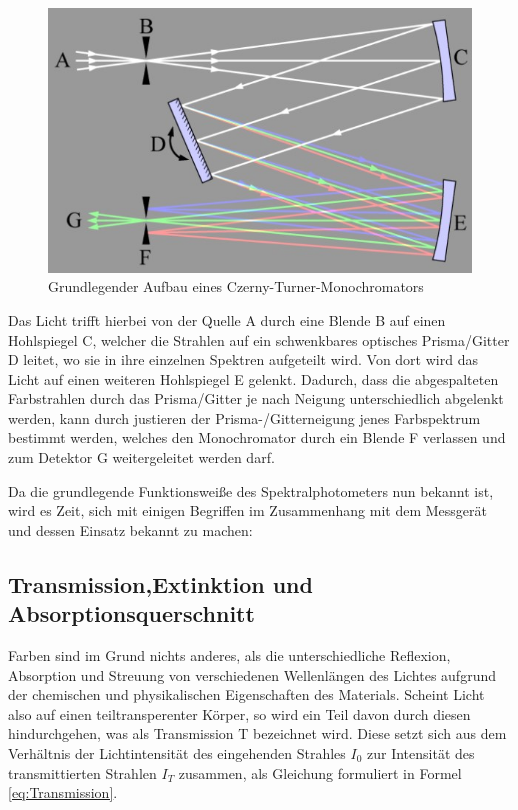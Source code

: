 \documentclass[12pt,a4paper,twoside]{article}
\begin{document}
\begin{figure}[H]
    \centering
    \includegraphics[width=0.6\linewidth]{nudes/MonochromatorAufbau.jpg}
    \caption{Grundlegender Aufbau eines Czerny-Turner-Monochromators}
    \label{fig:MonochromatorAufbau}
\end{figure}

\noindent
Das Licht trifft hierbei von der Quelle A durch eine Blende B auf einen Hohlspiegel C, welcher die Strahlen auf ein schwenkbares optisches Prisma/Gitter D leitet, wo sie in ihre einzelnen Spektren aufgeteilt wird.
Von dort wird das Licht auf einen weiteren Hohlspiegel E gelenkt. Dadurch, dass die abgespalteten Farbstrahlen durch das Prisma/Gitter je nach Neigung unterschiedlich abgelenkt werden, kann durch justieren der Prisma-/Gitterneigung jenes Farbspektrum bestimmt werden, welches den Monochromator durch ein Blende F verlassen und zum Detektor G weitergeleitet werden darf. \newline

\noindent
Da die grundlegende Funktionsweiße des Spektralphotometers nun bekannt ist, wird es Zeit, sich mit einigen Begriffen im Zusammenhang mit dem Messgerät und dessen Einsatz bekannt zu machen:


\subsection{Transmission,Extinktion und Absorptionsquerschnitt}

Farben sind im Grund nichts anderes, als die unterschiedliche Reflexion, Absorption und Streuung von verschiedenen Wellenlängen des Lichtes aufgrund der chemischen und physikalischen Eigenschaften des Materials. 
Scheint Licht also auf einen teiltransperenter Körper, so wird ein Teil davon durch diesen hindurchgehen, was als Transmission T bezeichnet wird. Diese setzt sich aus dem Verhältnis der Lichtintensität des eingehenden Strahles $I_{0}$ zur Intensität des transmittierten Strahlen $I_{T}$ zusammen, als Gleichung formuliert in Formel \ref{eq:Transmission}.
\end{document}
